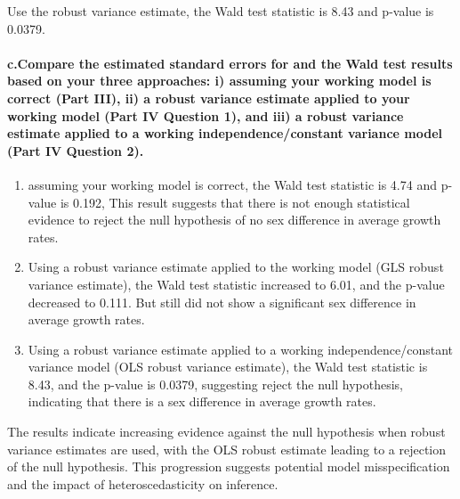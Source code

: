\documentclass[
]{article}
\begin{document}
Use the robust variance estimate, the Wald test statistic is 8.43 and
p-value is 0.0379.

\hypertarget{c.compare-the-estimated-standard-errors-for-and-the-wald-test-results-based-on-your-three-approaches-i-assuming-your-working-model-is-correct-part-iii-ii-a-robust-variance-estimate-applied-to-your-working-model-part-iv-question-1-and-iii-a-robust-variance-estimate-applied-to-a-working-independenceconstant-variance-model-part-iv-question-2.}{%
\paragraph{c.Compare the estimated standard errors for and the Wald test
results based on your three approaches: i) assuming your working model
is correct (Part III), ii) a robust variance estimate applied to your
working model (Part IV Question 1), and iii) a robust variance estimate
applied to a working independence/constant variance model (Part IV
Question
2).}\label{c.compare-the-estimated-standard-errors-for-and-the-wald-test-results-based-on-your-three-approaches-i-assuming-your-working-model-is-correct-part-iii-ii-a-robust-variance-estimate-applied-to-your-working-model-part-iv-question-1-and-iii-a-robust-variance-estimate-applied-to-a-working-independenceconstant-variance-model-part-iv-question-2.}}

\begin{enumerate}
\def\labelenumi{\roman{enumi})}
\item
  assuming your working model is correct, the Wald test statistic is
  4.74 and p-value is 0.192, This result suggests that there is not
  enough statistical evidence to reject the null hypothesis of no sex
  difference in average growth rates.
\item
  Using a robust variance estimate applied to the working model (GLS
  robust variance estimate), the Wald test statistic increased to 6.01,
  and the p-value decreased to 0.111. But still did not show a
  significant sex difference in average growth rates.
\item
  Using a robust variance estimate applied to a working
  independence/constant variance model (OLS robust variance estimate),
  the Wald test statistic is 8.43, and the p-value is 0.0379, suggesting
  reject the null hypothesis, indicating that there is a sex difference
  in average growth rates.
\end{enumerate}

The results indicate increasing evidence against the null hypothesis
when robust variance estimates are used, with the OLS robust estimate
leading to a rejection of the null hypothesis. This progression suggests
potential model misspecification and the impact of heteroscedasticity on
inference.
\end{document}
